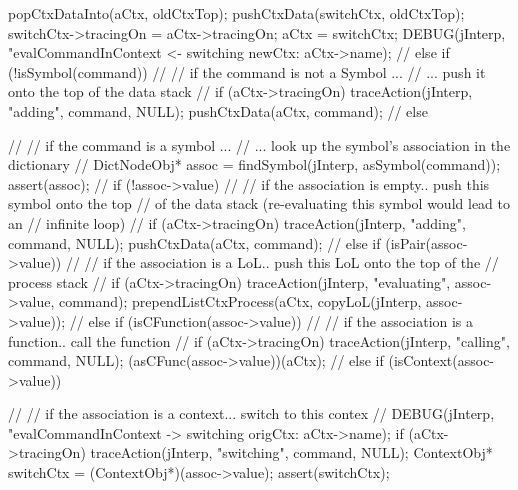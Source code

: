 {{{      popCtxDataInto(aCtx, oldCtxTop);
      pushCtxData(switchCtx, oldCtxTop);
      switchCtx->tracingOn = aCtx->tracingOn;
      aCtx = switchCtx;
      DEBUG(jInterp, "evalCommandInContext <- switching newCtx: %
            aCtx->name);
      //
    } else if (!isSymbol(command)) {
      //
      // if the command is not a Symbol ...
      //  ...  push it onto the top of the data stack
      //
      if (aCtx->tracingOn)
        traceAction(jInterp, "adding", command, NULL);
      pushCtxData(aCtx, command);
      //
    } else {
      //
      // if the command is a symbol ...
      //  ... look up the symbol's association in the dictionary
      //
      DictNodeObj* assoc = findSymbol(jInterp, asSymbol(command));
      assert(assoc);
      //
      if (!assoc->value) {
        //
        // if the association is empty.. push this symbol onto the top
        // of the data stack (re-evaluating this symbol would lead to an
        // infinite loop)
        //
        if (aCtx->tracingOn)
          traceAction(jInterp, "adding", command, NULL);
        pushCtxData(aCtx, command);
        //
      } else if (isPair(assoc->value)) {
        //
        // if the association is a LoL.. push this LoL onto the top of the
        // process stack
        //
        if (aCtx->tracingOn)
          traceAction(jInterp, "evaluating", assoc->value, command);
        prependListCtxProcess(aCtx,
          copyLoL(jInterp, assoc->value));
        //
      } else if (isCFunction(assoc->value)) {
        //
        // if the association is a function.. call the function
        //
        if (aCtx->tracingOn)
          traceAction(jInterp, "calling", command, NULL);
        (asCFunc(assoc->value))(aCtx);
        //
      } else if (isContext(assoc->value)) {
        //
        // if the association is a context... switch to this contex
        //
        DEBUG(jInterp, "evalCommandInContext -> switching origCtx: %
              aCtx->name);
        if (aCtx->tracingOn)
          traceAction(jInterp, "switching", command, NULL);
        ContextObj* switchCtx = (ContextObj*)(assoc->value);
        assert(switchCtx);

}}}}
